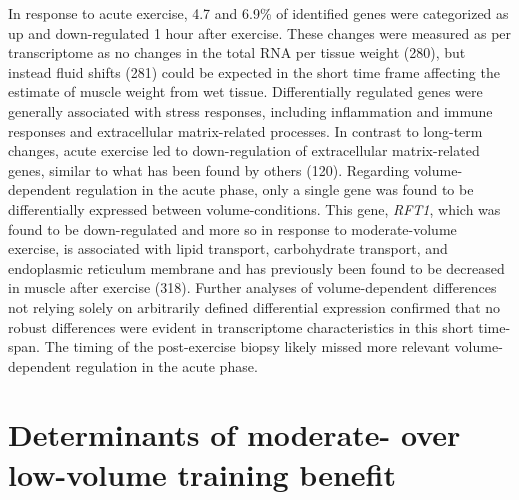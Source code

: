 \documentclass[twoside,10pt]{gihclass} %
\begin{document}
In response to acute exercise, 4.7 and 6.9\% of identified genes were categorized as up and down-regulated 1 hour after exercise.
These changes were measured as per transcriptome as no changes in the total RNA per tissue weight
(280),
but instead fluid shifts (281)
could be expected in the short time frame affecting the estimate of muscle weight from wet tissue.
Differentially regulated genes were generally associated with stress responses, including inflammation and immune responses and extracellular matrix-related processes. In contrast to long-term changes, acute exercise led to down-regulation of extracellular matrix-related genes, similar to what has been found by others (120).
Regarding volume-dependent regulation in the acute phase, only a single gene was found to be differentially expressed between volume-conditions. This gene, \emph{RFT1}, which was found to be down-regulated and more so in response to moderate-volume exercise, is associated with lipid transport, carbohydrate transport, and endoplasmic reticulum membrane and has previously been found to be decreased in muscle after exercise (318).
Further analyses of volume-dependent differences not relying solely on arbitrarily defined differential expression confirmed that no robust differences were evident in transcriptome characteristics in this short time-span.
The timing of the post-exercise biopsy likely missed more relevant volume-dependent regulation in the acute phase.

\hypertarget{determinants}{%
\section{Determinants of moderate- over low-volume training benefit}\label{determinants}}
\end{document}

